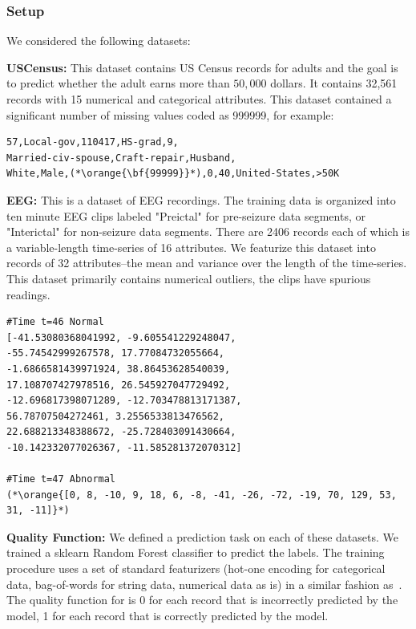 \subsubsection{Setup}
We considered the following datasets:

\vspace{0.5em}\noindent\textbf{USCensus: } This dataset contains US Census records for adults and the goal is to predict  whether the adult earns more than $50,000$ dollars. It contains 32,561 records with 15 numerical and categorical attributes. This dataset contained a significant number of missing values coded as 999999, for example:
\begin{lstlisting}
57,Local-gov,110417,HS-grad,9,
Married-civ-spouse,Craft-repair,Husband,
White,Male,(*\orange{\bf{99999}}*),0,40,United-States,>50K
\end{lstlisting}

\vspace{0.5em}\noindent\textbf{EEG: } This is a dataset of EEG recordings. 
The training data is organized into ten minute EEG clips labeled "Preictal" for pre-seizure data segments, or "Interictal" for non-seizure data segments. 
There are 2406 records each of which is a variable-length time-series of 16 attributes. We featurize this dataset into records of 32 attributes--the mean and variance over the length of the time-series. 
This dataset primarily contains numerical outliers, the clips have spurious readings.
\begin{lstlisting}
#Time t=46 Normal
[-41.53080368041992, -9.605541229248047, 
-55.74542999267578, 17.77084732055664,
-1.6866581439971924, 38.86453628540039, 
17.108707427978516, 26.545927047729492, 
-12.696817398071289, -12.703478813171387, 
56.78707504272461, 3.2556533813476562, 
22.688213348388672, -25.728403091430664, 
-10.142332077026367, -11.585281372070312]

#Time t=47 Abnormal
(*\orange{[0, 8, -10, 9, 18, 6, -8, -41, -26, -72, -19, 70, 129, 53, 31, -11]}*)
\end{lstlisting} 

\vspace{0.5em}\noindent\textbf{Quality Function: } We defined a prediction task on each of these datasets. We trained a \textsf{sklearn} Random Forest classifier to predict the labels. The training procedure uses a set of standard featurizers (hot-one encoding for categorical data, bag-of-words for string data, numerical data as is) in a similar fashion as~\cite{gokhale2014corleone}. The quality function for \sys is 0 for each record that is incorrectly predicted by the model, 1 for each record that is correctly predicted by the model.

